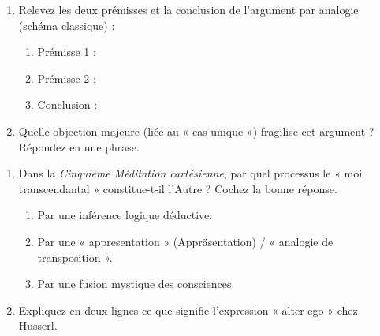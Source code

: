 \documentclass[11pt]{article}
\begin{document}
\begin{exercice}
\begin{enumerate}
    \item Relevez les deux prémisses et la conclusion de l'argument par analogie (schéma classique) :
    \begin{enumerate}
        \item Prémisse 1 : \underline{\hspace{8cm}}
        \item Prémisse 2 : \underline{\hspace{8cm}}
        \item Conclusion : \underline{\hspace{8cm}}
    \end{enumerate}
    \item Quelle objection majeure (liée au « cas unique ») fragilise cet argument ? Répondez en une phrase.
\end{enumerate}
\end{exercice}

\begin{exercice}
\begin{enumerate}
    \item Dans la \textit{Cinquième Méditation cartésienne}, par quel processus le « moi transcendantal » constitue-t-il l'Autre ? Cochez la bonne réponse.
    \begin{enumerate}
        \item Par une inférence logique déductive.
        \item Par une « appresentation » (Appräsentation) / « analogie de transposition ».
        \item Par une fusion mystique des consciences.
    \end{enumerate}
    \item Expliquez en deux lignes ce que signifie l'expression « alter ego » chez Husserl.
\end{enumerate}
\end{exercice}
\end{document}
